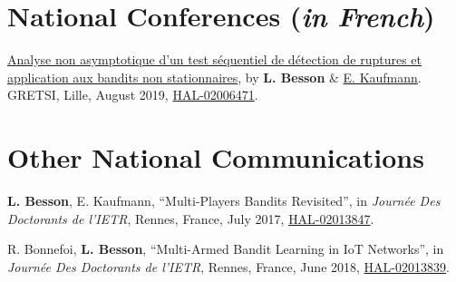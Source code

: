 \section*{National Conferences (\emph{in French})}
\renewcommand{\labelenumi}{[NC-\arabic{enumi}]}
\begin{etaremune}
\item
  \href{https://hal.inria.fr/hal-02006471/document}{Analyse non asymptotique d'un test séquentiel de détection de ruptures et application aux bandits non stationnaires}, by \textbf{L. Besson} \&
  \href{http://chercheurs.lille.inria.fr/ekaufman/research.html}{E.
  Kaufmann}.
  GRETSI, Lille, August 2019,
  \href{https://hal.inria.fr/hal-02006471}{HAL-02006471}.
  \cite{Besson2019Gretsi}
\end{etaremune}


\section*{Other National Communications}
\renewcommand{\labelenumi}{[ONC-\arabic{enumi}]}
\begin{etaremune}
  \item \textbf{L. Besson}, E. Kaufmann, ``Multi-Players Bandits Revisited'', in \emph{Journ\'{e}e Des Doctorants de l'IETR}, Rennes, France, July 2017, \href{https://hal.inria.fr/hal-02013847}{HAL-02013847}.
  \item R. Bonnefoi, \textbf{L. Besson}, ``Multi-Armed Bandit Learning in IoT Networks'', in \emph{Journ\'{e}e Des Doctorants de l'IETR}, Rennes, France, June 2018, \href{https://hal.inria.fr/hal-02013839}{HAL-02013839}.
\end{etaremune}


